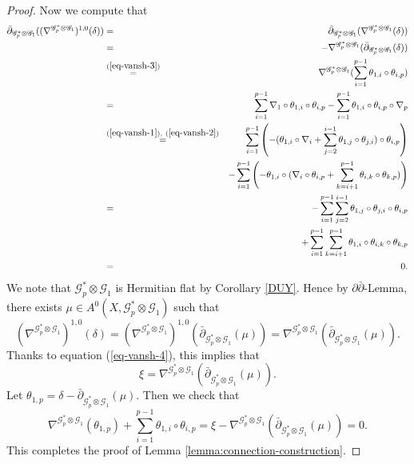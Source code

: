 \documentclass[english,reqno]{amsart}
\newcommand\sG{{\mathscr G}}
\newcommand\bp{{\bar\partial}}
\theoremstyle{plain}
\theoremstyle{definition}
\numberwithin{equation}{section} %
\begin{document}
\begin{proof}
    Now we compute that
    \begin{eqnarray*}
        \bp_{\sG_p^*\otimes \sG_1}((\nabla^{\sG_p^*\otimes \sG_1})^{1,0}(\delta))
        &=& \bp_{\sG_p^*\otimes \sG_1} (\nabla^{\sG_p^*\otimes \sG_1}(\delta))\\
        &=&-  \nabla^{\sG_p^*\otimes \sG_1}(\bp_{\sG_p^*\otimes \sG_1}(\delta))\\
        &\stackrel{(\ref{eq-vansh-3})}{=}&\nabla^{\sG_p^*\otimes \sG_1}(\sum_{i=1}^{p-1}\theta_{1,i}\circ \theta_{i,p})\\
        &=& \sum_{i=1}^{p-1}\nabla_1\circ \theta_{1,i} \circ \theta_{i,p}- \sum_{i=1}^{p-1} \theta_{1,i}\circ\theta_{i,p}\circ
        \nabla_p\\
        &\stackrel{(\ref{eq-vansh-1}),\ (\ref{eq-vansh-2})}{=}&   \sum_{i=1}^{p-1} \left(- (\theta_{1,i} \circ \nabla_i + \sum_{j=2}^{i-1} \theta_{1,j}\circ \theta_{j,i}) \circ \theta_{i,p}\right) \\
        && -\sum_{i=1}^{p-1} \left(-\theta_{1,i}\circ (\nabla_i \circ \theta_{i,p}  + \sum_{k=i+1}^{p-1} \theta_{i,k} \circ \theta_{k,p})\right)\\
        &=&   -\sum_{i=1}^{p-1}  \sum_{j=2}^{i-1} \theta_{1,j}\circ \theta_{j,i} \circ \theta_{i,p}  \\
        && +\sum_{i=1}^{p-1}\sum_{k=i+1}^{p-1}\theta_{1,i}\circ  \theta_{i,k} \circ \theta_{k,p}\\
        &=&0.
    \end{eqnarray*}
    We note that  $\sG_p^*\otimes \sG_1$ is Hermitian flat by Corollary \ref{DUY}. Hence by $\partial\bp$-Lemma, there exists  $\mu \in A^0(X,\sG_p^*\otimes \sG_1)$ such that
    \begin{equation*}
    (\nabla^{\sG_p^*\otimes \sG_1})^{1,0}(\delta) =(\nabla^{\sG_p^*\otimes \sG_1})^{1,0} ( \bp_{\sG_p^*\otimes
        \sG_1}(\mu))= \nabla^{\sG_p^*\otimes \sG_1} ( \bp_{\sG_p^*\otimes
        \sG_1}(\mu)).
    \end{equation*}
    Thanks to equation (\ref{eq-vansh-4}), this implies that  $$ \xi = \nabla^{\sG_p^*\otimes \sG_1} ( \bp_{\sG_p^*\otimes \sG_1}(\mu)).$$
    Let  $\theta_{1,p}=\delta- \bp_{\sG_p^*\otimes \sG_1}(\mu)$.  Then we check that
    $$
    \nabla^{\sG_p^*\otimes \sG_1}(\theta_{1,p}) + \sum_{i=1}^{p-1}\theta_{1,i}\circ \theta_{i,p}
    = \xi  - \nabla^{\sG_p^*\otimes \sG_1}(\bp_{\sG_p^*\otimes \sG_1}(\mu)) = 0.
    $$
    This completes the proof of Lemma \ref{lemma:connection-construction}.
\end{proof}
\end{document}
